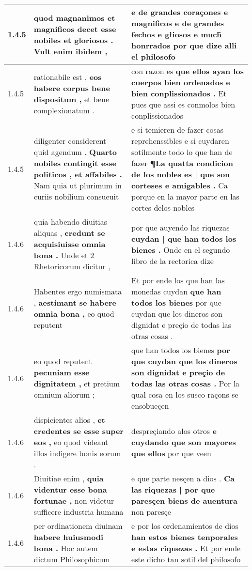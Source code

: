 \begin{tabular}{|p{1cm}|p{6.5cm}|p{6.5cm}|}
1.4.5 & quod magnanimos et magnificos decet \textbf{ esse nobiles et gloriosos . } Vult enim ibidem , & e de grandes coraçones e magnificos \textbf{ e de grandes fechos e głiosos e much̃ honrrados } por que dize alli el philosofo \\\hline
1.4.5 & rationabile est , \textbf{ eos habere corpus bene dispositum , } et bene complexionatum . & con razon es \textbf{ que ellos ayan los cuerpos bien ordenados e bien conplissionados . } Et pues que assi es conmolos bien conplissionados \\\hline
1.4.5 & diligenter considerent quid agendum . \textbf{ Quarto nobiles contingit esse politicos , et affabiles . } Nam quia ut plurimum in curiis nobilium consueuit & e si temieren de fazer cosas reprehenssibles e si cuydaren sotilmente todo lo que han de fazer \textbf{ ¶La quatta condicion de los nobles es | que son corteses e amigables . } Ca porque en la mayor parte en las cortes delos nobles \\\hline
1.4.6 & quia habendo diuitias aliquas , \textbf{ credunt se acquisiuisse omnia bona . } Unde et 2 Rhetoricorum dicitur , & por que auyendo las riquezas \textbf{ cuydan | que han todos los bienes . } Onde en el segundo libro de la rectorica dize \\\hline
1.4.6 & Habentes ergo numismata , \textbf{ aestimant se habere omnia bona , } eo quod reputent & Et por ende los que han las monedas cuydan \textbf{ que han todos los bienes } por que cuydan que los dineros son dignidat e preçio de todas las otras cosas . \\\hline
1.4.6 & eo quod reputent \textbf{ pecuniam esse dignitatem , } et pretium omnium aliorum ; & que han todos los bienes \textbf{ por que cuydan que los dineros son dignidat e preçio de todas las otras cosas . } Por la qual cosa en los susco raçons se ensoƀueçen \\\hline
1.4.6 & dispicientes alios , \textbf{ et credentes se esse super eos , } eo quod videant illos indigere bonis eorum . & despreçiando alos otros \textbf{ e cuydando que son mayores que ellos } por que veen \\\hline
1.4.6 & Diuitiae enim , \textbf{ quia videntur esse bona fortunae , } non videtur sufficere industria humana & e que parte nesçen a dios . \textbf{ Ca las riquezas | por que paresçen biens de auentura } non paresçe \\\hline
1.4.6 & per ordinationem diuinam \textbf{ habere huiusmodi bona . } Hoc autem dictum Philosophicum & e por los ordenamientos de dios \textbf{ han estos bienes tenporales e estas riquezas . } Et por ende este dicho tan sotil del philosofo \\\hline

\end{tabular}
